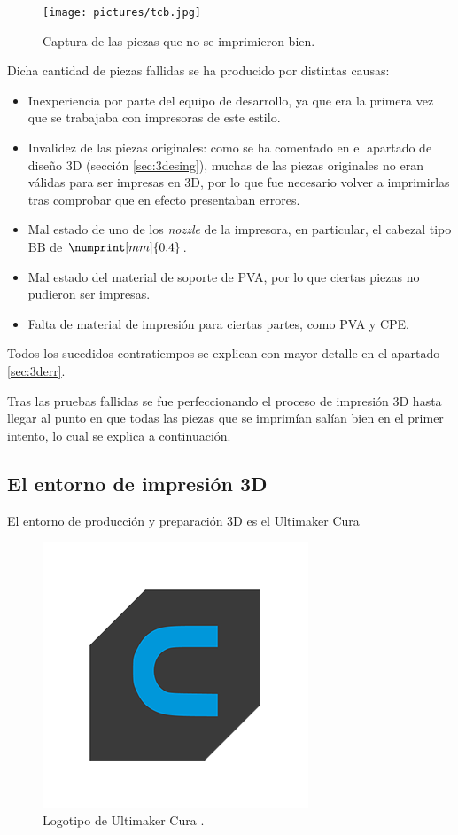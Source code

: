 \begin{figure}[H]
    \centering
    \texttt{[image: pictures/tcb.jpg]}
    \caption{Captura de las piezas que no se imprimieron bien.}
    \label{fig:tcb}
\end{figure}

Dicha cantidad de piezas fallidas se ha producido por distintas causas:

\begin{itemize}
    \item Inexperiencia por parte del equipo de desarrollo, ya que era la primera vez
    que se trabajaba con impresoras de este estilo.

    \item Invalidez de las piezas originales: como se ha comentado en el apartado de
    diseño 3D (sección \ref{sec:3desing}), muchas de las piezas originales no eran
    válidas para ser impresas en 3D, por lo que fue necesario volver a imprimirlas
    tras comprobar que en efecto presentaban errores.

    \item Mal estado de uno de los \textit{nozzle} de la impresora, en particular,
    el cabezal tipo BB de $\numprint[mm]{0.4}$.

    \item Mal estado del material de soporte de \ac{PVA}, por lo que ciertas piezas
    no pudieron ser impresas.

    \item Falta de material de impresión para ciertas partes, como \ac{PVA} y \ac{CPE}.
\end{itemize}

Todos los sucedidos contratiempos se explican con mayor detalle en el apartado
\ref{sec:3derr}.

Tras las pruebas fallidas se fue perfeccionando el proceso de impresión 3D hasta llegar
al punto en que todas las piezas que se imprimían salían bien en el primer intento, lo
cual se explica a continuación.

\subsection{El entorno de impresión 3D}
El entorno de producción y preparación 3D es el Ultimaker Cura

\begin{figure}[H]
    \centering
    \includegraphics[width=.5\linewidth]{pictures/Ultimaker_cura.png}
    \caption*{Logotipo de Ultimaker Cura \cite{CuraSoftware2019}.}
\end{figure}

